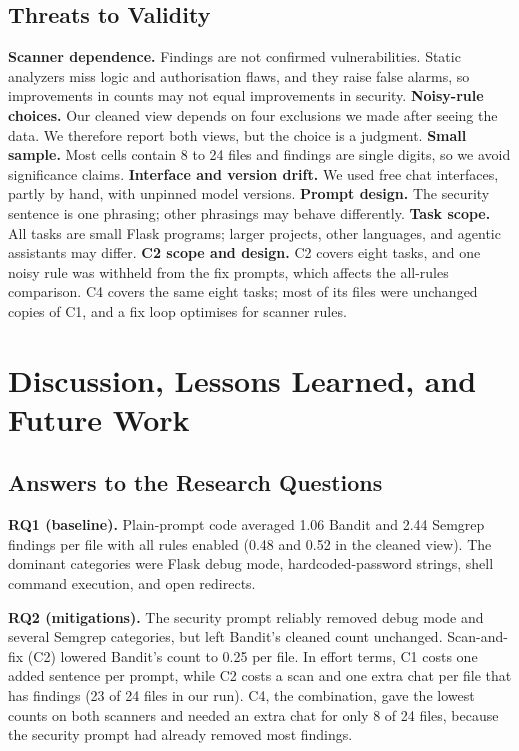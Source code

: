 \documentclass[conference]{IEEEtran}
\begin{document}
\subsection{Threats to Validity}
\textbf{Scanner dependence.} Findings are not confirmed vulnerabilities. Static analyzers miss logic and authorisation flaws, and they raise false alarms, so improvements in counts may not equal improvements in security. \textbf{Noisy-rule choices.} Our cleaned view depends on four exclusions we made after seeing the data. We therefore report both views, but the choice is a judgment. \textbf{Small sample.} Most cells contain 8 to 24 files and findings are single digits, so we avoid significance claims. \textbf{Interface and version drift.} We used free chat interfaces, partly by hand, with unpinned model versions. \textbf{Prompt design.} The security sentence is one phrasing; other phrasings may behave differently. \textbf{Task scope.} All tasks are small Flask programs; larger projects, other languages, and agentic assistants may differ. \textbf{C2 scope and design.} C2 covers eight tasks, and one noisy rule was withheld from the fix prompts, which affects the all-rules comparison. C4 covers the same eight tasks; most of its files were unchanged copies of C1, and a fix loop optimises for scanner rules.

\section{Discussion, Lessons Learned, and Future Work}
\subsection{Answers to the Research Questions}
\textbf{RQ1 (baseline).} Plain-prompt code averaged 1.06 Bandit and 2.44 Semgrep findings per file with all rules enabled (0.48 and 0.52 in the cleaned view). The dominant categories were Flask debug mode, hardcoded-password strings, shell command execution, and open redirects.

\textbf{RQ2 (mitigations).} The security prompt reliably removed debug mode and several Semgrep categories, but left Bandit's cleaned count unchanged. Scan-and-fix (C2) lowered Bandit's count to 0.25 per file. In effort terms, C1 costs one added sentence per prompt, while C2 costs a scan and one extra chat per file that has findings (23 of 24 files in our run). C4, the combination, gave the lowest counts on both scanners and needed an extra chat for only 8 of 24 files, because the security prompt had already removed most findings.
\end{document}
